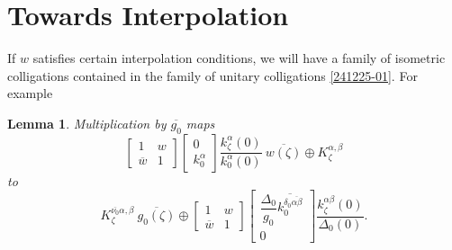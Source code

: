 \documentclass[reqno,11pt,centertags]{article}
\newcommand{\z}{\zeta}
\newtheorem{lemma}[theorem]{Lemma}
\theoremstyle{definition}
\def\a{\alpha}
\def\b{\beta}
\def\d{\delta}
\def\D{\Delta}
\def\z{\zeta}
\begin{document}
\section{Towards Interpolation}
If $w$ satisfies certain interpolation conditions, we will have a family of isometric
colligations contained in the family of unitary colligations \eqref{241225-01}.
For example
\begin{lemma}
Multiplication by $\overline{g_0}$ maps
$$
\begin{bmatrix}
1 & w \\
\overline{w} & 1
\end{bmatrix}
\begin{bmatrix}
0
\\
k^\a_0
\end{bmatrix}
\dfrac{k^\a_\z(0)}{k^\a_0(0)}
\ \overline{w(\zeta)}
\oplus
K_{\zeta}^{\alpha, \beta}
$$
to
$$
K_{\zeta}^{\overline{\nu_0}\alpha, \beta}
\ \overline{g_0(\z)}
\oplus
\begin{bmatrix}
1 & w \\
\overline{w} & 1
\end{bmatrix}
\begin{bmatrix}
\dfrac{\D_0}{g_0}\overline{k^{\d_0\overline{\alpha\b}}_0}
\\
0
\end{bmatrix}
\dfrac{k^{\a\b}_\z(0)}{\D_0(0)}
.
$$
\end{lemma}
\end{document}
